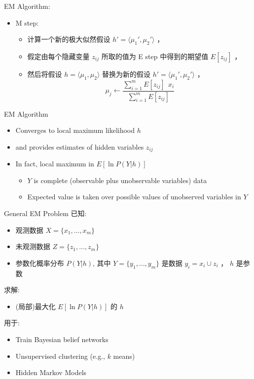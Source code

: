 \documentclass[presentation]{beamer}
\begin{document}
\begin{frame}[label={sec:org6b8e6f1}]{EM Algorithm:}
\begin{itemize}
\item M step:
\begin{itemize}
\item 计算一个新的极大似然假设 \(h' = \langle \mu_1', \mu_2' \rangle\) ，
\item 假定由每个隐藏变量 \(z_{ij}\) 所取的值为 E step 中得到的期望值 \(E[z_{ij}]\) ，
\item 然后将假设 \(h =\langle \mu_1, \mu_2 \rangle\) 替换为新的假设 \(h' = \langle \mu_1', \mu_2' \rangle\) ，
$$\mu_j \leftarrow \frac{\sum_{i=1}^m E[z_{ij}] \ \  x_i}{\sum_{i=1}^m E[z_{ij}]}$$
\end{itemize}
\end{itemize}
\end{frame}

\begin{frame}[label={sec:org937c4e4}]{EM Algorithm}
\begin{itemize}
\item Converges to local maximum likelihood \(h\)
\item and provides estimates of hidden variables \(z_{ij}\)
\item In fact, local maximum in \(E[\ln P(Y|h)]\)
\begin{itemize}
\item \(Y\) is complete (observable plus unobservable variables) data
\item Expected value is taken over possible values of unobserved variables in \(Y\)
\end{itemize}
\end{itemize}
\end{frame}


\begin{frame}[label={sec:orga6091f2}]{General  EM Problem}
已知:
\begin{itemize}
\item 观测数据 \(X=\{x_1, \ldots, x_m\}\)
\item 未观测数据 \(Z=\{z_1, \dots, z_m\}\)
\item 参数化概率分布 \(P(Y|h)\), 其中  \(Y=\{y_1, \dots, y_m\}\) 是数据 \(y_i = x_i \cup z_i\) ，  \(h\) 是参数
\end{itemize}

求解:
\begin{itemize}
\item (局部)最大化 \(E[\ln P(Y|h)]\) 的 \(h\)
\end{itemize}


用于:
\begin{itemize}
\item Train Bayesian belief networks
\item Unsupervised clustering (e.g., \(k\) means)
\item Hidden Markov Models
\end{itemize}
\end{frame}
\end{document}
